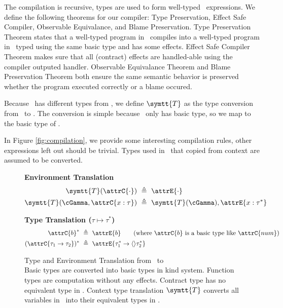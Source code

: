 The compilation is recursive, types are used to form well-typed \lange\
expressions. We define the following theorems for our compiler: Type
Preservation, Effect Safe Compiler, Observable Equivalance, and Blame
Preservation. Type Preservation Theorem states that a well-typed program in
\langc\ compiles into a well-typed program in \lange\ typed using the same
basic type and has some effects. Effect Safe Compiler Theorem makes sure that
all (contract) effects are handled-able using the compiler outputed handler.
Observable Equivalance Theorem and Blame Preservation Theorem both ensure the
same semantic behavior is preserved whether the program executed correctly or a
blame occured.

Because \lange\ has different types from \langc, we define $\symtt{T}$ as the
type conversion from \cGamma\ to \eGamma. The conversion is simple because
\langc\ only has basic type, so we map to the basic type of \lange.

In Figure \ref{fig:compilation}, we provide some interesting compilation rules,
other expressions left out should be trivial. Types used in \lange\ that copied
from \langc context are assumed to be converted.

\begin{figure}[htbp]
  \centering
  \textbf{Environment Translation}
  \begin{align*}
    \symtt{T}(\attrC{\cdot}) \ &\triangleq \ \attrE{\cdot} \\
    \symtt{T}(\cGamma, \attrC{x : \tau}) \ &\triangleq \ \symtt{T}(\cGamma), \attrE{x : \tau^*}
  \end{align*}

  \vspace{1em}
  \textbf{Type Translation ($\tau \mapsto \tau^*$)}
  \begin{align*}
    \attrC{b}^* \ &\triangleq \ \attrE{b} \qquad \text{(where } \attrC{b} \text{ is a basic type like } \attrC{num} \text{)} \\
    (\attrC{\tau_1 \to \tau_2})^* \ &\triangleq \ \attrE{\tau_1^* \to \langle\rangle\tau_2^*}
  \end{align*}

  \caption[Type and Environment Translation from \langc\ to \lange]
  {Type and Environment Translation from \langc\ to \lange\\ \small Basic types
  are converted into basic types in kind system. Function types are
  computation without any effects. Contract type has no equivalent type in
  \lange. Context type translation $\symtt{T}$ converts all variables in \langc\
  into their equivalent types in \lange.}
  \label{fig:env-translation}
\end{figure}


